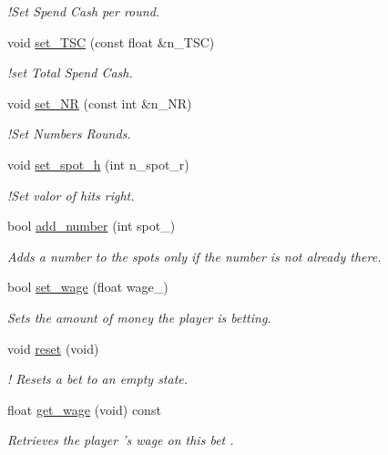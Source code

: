 \begin{DoxyCompactItemize}
\begin{DoxyCompactList}\small\item\em !\+Set Spend Cash per round. \end{DoxyCompactList}\item 
void \hyperlink{classKenoBet_abd6b6b0b0ed9c3d030a71673dc89f39a}{set\+\_\+\+T\+SC} (const float \&n\+\_\+\+T\+SC)
\begin{DoxyCompactList}\small\item\em !set Total Spend Cash. \end{DoxyCompactList}\item 
void \hyperlink{classKenoBet_a63780c5d19157760a2760407cd68149f}{set\+\_\+\+NR} (const int \&n\+\_\+\+NR)
\begin{DoxyCompactList}\small\item\em !\+Set Numbers Rounds. \end{DoxyCompactList}\item 
void \hyperlink{classKenoBet_acdeff501accf00661e0151901bc888c0}{set\+\_\+spot\+\_\+h} (int n\+\_\+spot\+\_\+r)
\begin{DoxyCompactList}\small\item\em !\+Set valor of hits right. \end{DoxyCompactList}\item 
bool \hyperlink{classKenoBet_aba848a50d30a0155459eb9f5cbb91966}{add\+\_\+number} (int spot\+\_\+)
\begin{DoxyCompactList}\small\item\em Adds a number to the spots only if the number is not already there. \end{DoxyCompactList}\item 
bool \hyperlink{classKenoBet_a2b21e387cde33818230d9895845b2d9a}{set\+\_\+wage} (float wage\+\_\+)
\begin{DoxyCompactList}\small\item\em Sets the amount of money the player is betting. \end{DoxyCompactList}\item 
void \hyperlink{classKenoBet_acc2afd4d502e44fdfbb122f3389bc633}{reset} (void)
\begin{DoxyCompactList}\small\item\em ! Resets a bet to an empty state. \end{DoxyCompactList}\item 
float \hyperlink{classKenoBet_a65f0348e49dd8a2e2dddfcc9a1f05a65}{get\+\_\+wage} (void) const
\begin{DoxyCompactList}\small\item\em Retrieves the player ’s wage on this bet . \end{DoxyCompactList}\item 

\end{DoxyCompactItemize}
